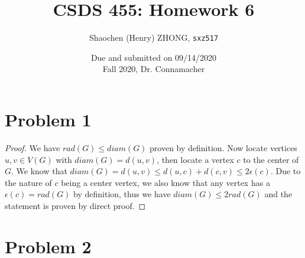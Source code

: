 \documentclass[11pt]{article}
\newcommand{\ilc}{\texttt}
\begin{document}
\title{\textbf{CSDS 455: Homework 6}}

\author{Shaochen (Henry) ZHONG, \ilc{sxz517}}
\date{Due and submitted on 09/14/2020 \\ Fall 2020, Dr. Connamacher}
\maketitle

\section*{Problem 1}

\begin{proof}
We have $rad(G) \leq diam(G)$ proven by definition. Now locate vertices $u, v \in V(G)$ with $diam(G) = d(u, v)$, then locate a vertex $c$ to the center of $G$. We know that $diam(G) = d(u, v) \leq d(u, c) + d(c, v) \leq 2\epsilon(c)$. Due to the nature of $c$ being a center vertex, we also know that any vertex has a $\epsilon(c) = rad(G)$ by definition, thus we have $diam(G) \leq 2rad(G)$ and the statement is proven by direct proof.
\end{proof}

\section*{Problem 2}
\end{document}
